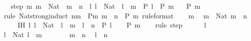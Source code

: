 \begin{isabellebody}
\ \ \ step{\isacharcolon}{\kern0pt}\ {\isachardoublequoteopen}{\isasymAnd}m{\isachardot}{\kern0pt}\ m\ {\isacharcolon}{\kern0pt}\ Nat\ {\isasymLongrightarrow}\ m\ {\isasymle}\ n\ {\isasymLongrightarrow}\ {\isacharparenleft}{\kern0pt}{\isasymAnd}l{\isachardot}{\kern0pt}\ l\ {\isacharcolon}{\kern0pt}\ Nat\ {\isasymLongrightarrow}\ l\ {\isacharless}{\kern0pt}\ m\ {\isasymLongrightarrow}\ P\ l{\isacharparenright}{\kern0pt}\ {\isasymLongrightarrow}\ P\ m{\isachardoublequoteclose}\isanewline
\ \ \ {\isachardoublequoteopen}P\ m{\isachardoublequoteclose}\isanewline
%
\isadelimproof
%
\endisadelimproof
%
\isatagproof
{}\isamarkupfalse%
\ {\isacharparenleft}{\kern0pt}rule\ Nat{\isacharunderscore}{\kern0pt}strong{\isacharunderscore}{\kern0pt}induct{\isacharbrackleft}{\kern0pt}\ {\isacharquery}{\kern0pt}n{\isacharequal}{\kern0pt}m\ \ {\isacharquery}{\kern0pt}P{\isacharequal}{\kern0pt}{\isachardoublequoteopen}{\isasymlambda}m{\isachardot}{\kern0pt}\ m\ {\isasymle}\ n\ {\isasymlongrightarrow}\ P\ m{\isachardoublequoteclose}{\isacharcomma}{\kern0pt}\ rule{\isacharunderscore}{\kern0pt}format{\isacharbrackright}{\kern0pt}{\isacharparenright}{\kern0pt}\isanewline
\ \ \isamarkupfalse%
\ m\ \isamarkupfalse%
\ {\isachardoublequoteopen}m\ {\isacharcolon}{\kern0pt}\ Nat{\isachardoublequoteclose}\ {\isachardoublequoteopen}m\ {\isasymle}\ n{\isachardoublequoteclose}\isanewline
\ \ \ \ \ IH{\isacharcolon}{\kern0pt}\ {\isachardoublequoteopen}{\isasymAnd}l{\isachardot}{\kern0pt}\ l\ {\isacharcolon}{\kern0pt}\ Nat\ {\isasymLongrightarrow}\ l\ {\isacharless}{\kern0pt}\ m\ {\isasymLongrightarrow}\ l\ {\isasymle}\ n\ {\isasymLongrightarrow}\ P\ l{\isachardoublequoteclose}\isanewline
\ \ \isamarkupfalse%
\ {\isachardoublequoteopen}P\ m{\isachardoublequoteclose}\isanewline
\ \ \isamarkupfalse%
\ {\isacharparenleft}{\kern0pt}rule\ step{\isacharparenright}{\kern0pt}\isanewline
\ \ \ \ \isamarkupfalse%
\ l\ \isamarkupfalse%
\ {\isachardoublequoteopen}l\ {\isacharcolon}{\kern0pt}\ Nat{\isachardoublequoteclose}\ {\isachardoublequoteopen}l\ {\isacharless}{\kern0pt}\ m{\isachardoublequoteclose}\isanewline
\ \ \ \ \isamarkupfalse%
\ \isamarkupfalse%
\ {\isacartoucheopen}m\ {\isasymle}\ n{\isacartoucheclose}\ \isamarkupfalse%
\ {\isachardoublequoteopen}l\ {\isasymle}\ n{\isachardoublequoteclose}\isanewline
\ \ \ \ \ \ \isamarkupfalse%

\end{isabellebody}
